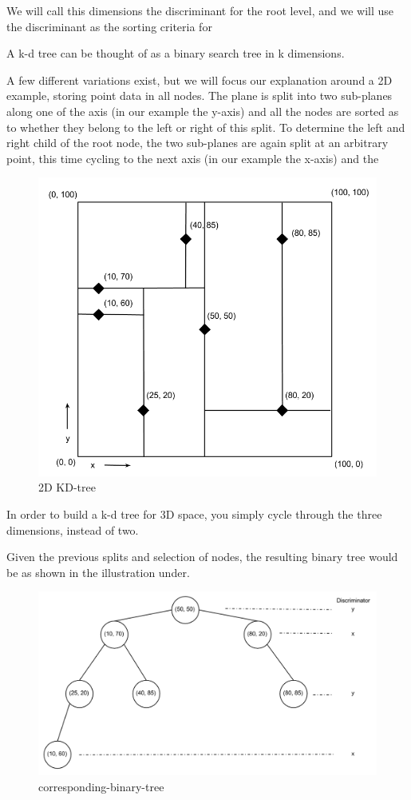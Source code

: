 We will call this dimensions the discriminant for the root level, and we will use the discriminant as the sorting criteria for


A k-d tree can be thought of as a binary search tree in k dimensions.

A few different variations exist, but we will focus our explanation around a 2D example, storing point data in all nodes. The plane is split into two sub-planes along one of the axis (in our example the y-axis) and all the nodes are sorted as to whether they belong to the left or right of this split. To determine the left and right child of the root node, the two sub-planes are again split at an arbitrary point, this time cycling to the next axis (in our example the x-axis) and the

\begin{figure}[ht!]
\centering
\includegraphics[width=120mm]{../gfx/kd_tree_illustration_graph.png}

\caption{2D KD-tree}
\label{fig:kdtree_2d}
\end{figure}

In order to build a k-d tree for 3D space, you simply cycle through the three dimensions, instead of two.

Given the previous splits and selection of nodes, the resulting binary tree would be as shown in the illustration under.

\begin{figure}[ht!]
\centering
\includegraphics[width=120mm]{../gfx/kd_tree_illustration_tree.png}

\caption{corresponding-binary-tree}
\label{fig:tree_0001}
\end{figure}

